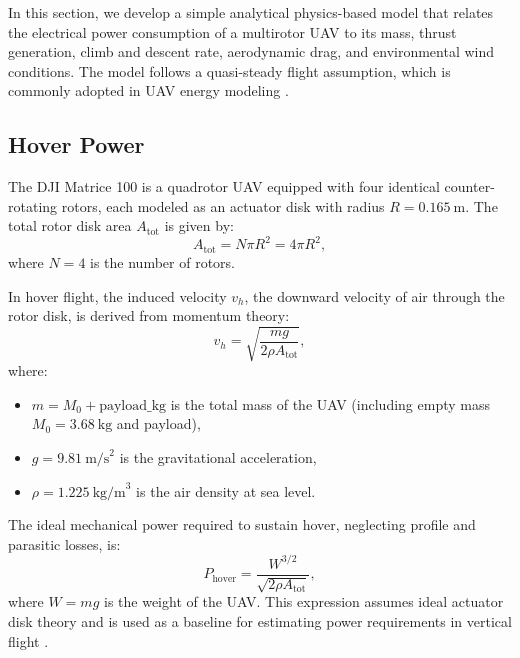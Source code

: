In this section, we develop a simple analytical physics-based model that relates the electrical power consumption of a multirotor UAV to its mass, thrust generation, climb and descent rate, aerodynamic drag, and environmental wind conditions. The model follows a quasi-steady flight assumption, which is commonly adopted in UAV energy modeling \cite{lieshman2006, hwang2018}.

\subsection{Hover Power}

The DJI Matrice 100 is a quadrotor UAV equipped with four identical counter-rotating rotors, each modeled as an actuator disk with radius $ R = 0.165~\text{m} $. The total rotor disk area $A_{\text{tot}}$ is given by:
\begin{equation}
A_{\text{tot}} = N \pi R^2 = 4 \pi R^2,
\end{equation}
where $ N = 4 $ is the number of rotors.

In hover flight, the induced velocity $ v_h $, the downward velocity of air through the rotor disk, is derived from momentum theory:
\begin{equation}
v_h = \sqrt{\frac{mg}{2 \rho A_{\text{tot}}}},
\end{equation}
where:
\begin{itemize}
    \item $ m = M_0 + \text{payload\_kg} $ is the total mass of the UAV (including empty mass $ M_0 = 3.68~\text{kg} $ and payload),
    \item $ g = 9.81~\text{m/s}^2 $ is the gravitational acceleration,
    \item $ \rho = 1.225~\text{kg/m}^3 $ is the air density at sea level.
\end{itemize}

The ideal mechanical power required to sustain hover, neglecting profile and parasitic losses, is:
\begin{equation}
P_{\text{hover}} = \frac{W^{3/2}}{\sqrt{2 \rho A_{\text{tot}}}},
\end{equation}
where $ W = mg $ is the weight of the UAV. This expression assumes ideal actuator disk theory and is used as a baseline for estimating power requirements in vertical flight \cite{lieshman2006, johnson1980, gong2022}.

